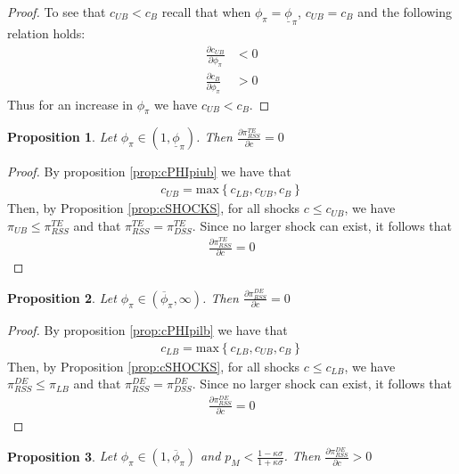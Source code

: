 \documentclass[11pt]{article}
\newtheorem{proposition}{Proposition}
\begin{document}
\begin{singlespace}
\begin{proof}
			To see that $c_{UB} < c_{B}$ recall that when $\phi_{\pi} = \underline{\phi}_{\pi}$,  $c_{UB} = c_{B}$ and the following relation holds:
			\begin{align*}
			\frac{\partial c_{UB}}{\partial \phi_{\pi}} &< 0\\
			\frac{\partial c_{B}}{\partial \phi_{\pi}} & > 0
			\end{align*}
			Thus for an increase in $\phi_{\pi}$ we have $c_{UB} < c_{B}$. 
		\end{proof}
		\begin{proposition}\label{prop:pi_tr_zero}
			Let $\phi_{\pi}\in(1,\underline{\phi}_{\pi})$. Then $\frac{\partial\pi_{RSS}^{TE}}{\partial c} = 0 $ 
		\end{proposition}
		\begin{proof}
			By proposition \ref{prop:cPHIpiub} we have that 
			\begin{align*}
			c_{UB} = \text{max}\left\{c_{LB}, c_{UB}, c_{B}\right\}
			\end{align*}
			Then, by Proposition \ref{prop:cSHOCKS}, for all shocks $c\le c_{UB}$, we have $\pi_{UB} \le \pi_{RSS}^{TE}$ and that $\pi_{RSS}^{TE} = \pi_{DSS}^{TE}$. Since no larger shock can exist, it follows that 
			\begin{align*}
			\frac{\partial\pi_{RSS}^{TE}}{\partial c} = 0
			\end{align*}
		\end{proof}
		\begin{proposition}\label{prop:pi_dr_zero}
			Let $\phi_{\pi}\in(\overline{\phi}_{\pi},\infty)$. Then $\frac{\partial\pi_{RSS}^{DE}}{\partial c} = 0 $ 
		\end{proposition}
		\begin{proof}
			By proposition \ref{prop:cPHIpilb} we have that 
			\begin{align*}
			c_{LB} = \text{max}\left\{c_{LB}, c_{UB}, c_{B}\right\}
			\end{align*}
			Then, by Proposition \ref{prop:cSHOCKS}, for all shocks $c\le c_{LB}$, we have $\pi_{RSS}^{DE}\le\pi_{LB} $ and that $\pi_{RSS}^{DE} = \pi_{DSS}^{DE}$. Since no larger shock can exist, it follows that 
			\begin{align*}
			\frac{\partial\pi_{RSS}^{DE}}{\partial c} = 0
			\end{align*}
		\end{proof}
		\begin{proposition}\label{prop:pi_dr_pos}
			Let $\phi_{\pi}\in(1,\overline{\phi}_{\pi})$ and $p_M < \frac{1-\kappa\sigma}{1+\kappa\sigma}$. Then $\frac{\partial\pi_{RSS}^{DE}}{\partial c} > 0 $ 

\end{proposition}
\end{singlespace}
\end{document}
